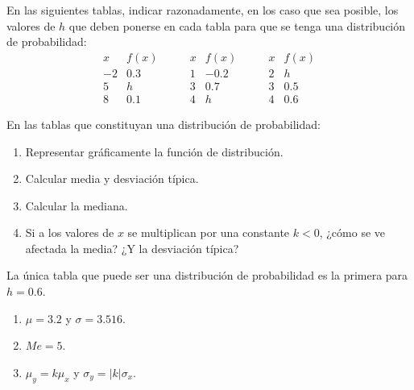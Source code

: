 {En las siguientes tablas, indicar razonadamente, en los caso que sea posible,
los valores de $h$ que deben ponerse en cada tabla para que se tenga una
distribución de probabilidad:
\[
\begin{array}{c|c}
x & f(x) \\
\hline
-2 & 0.3  \\
5 & h  \\
8 & 0.1
\end{array}
\qquad
\begin{array}{c|c}
x & f(x) \\
\hline
 1 & -0.2 \\
 3 & 0.7 \\
 4 & h
\end{array}
 \qquad
\begin{array}{c|c}
x & f(x) \\
\hline
 2 & h \\
 3 & 0.5 \\
 4 & 0.6
\end{array}
\]

En las tablas que constituyan una distribución de probabilidad:
\begin{enumerate}
\item Representar gráficamente la función de distribución.
\item Calcular media y desviación típica.
\item Calcular la mediana.
\item Si a los valores de $x$ se multiplican por una constante $k<0$, ¿cómo se ve afectada la media? ¿Y la desviación típica?
\end{enumerate}
} 
{La única tabla que puede ser una distribución de probabilidad es la primera para $h=0.6$.
\begin{enumerate}[start=2]
\item $\mu=3.2$ y $\sigma=3.516$.
\item $Me=5$.
\item $\mu_y=k\mu_x$ y $\sigma_y=|k|\sigma_x$.
\end{enumerate}
}

